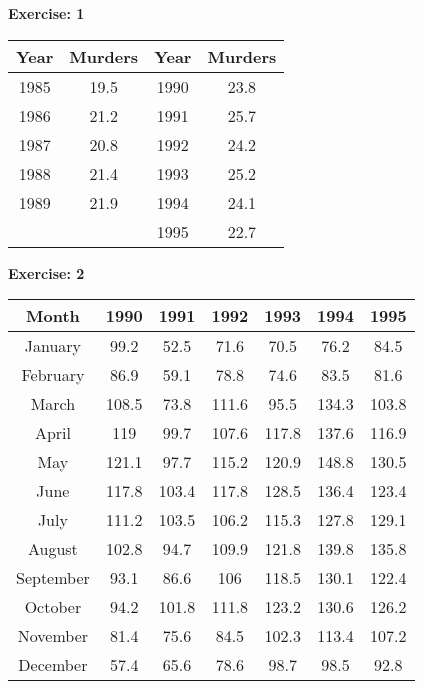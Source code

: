 \documentclass[12pt, english]{article}
\numberwithin{equation}{section} %
\theoremstyle{plain}
\theoremstyle{definition}
\begin{document}
\newpage
\begin{center}
	\huge{\textbf{Exercise: 1}}
\end{center}

\begin{center}
	\begin{tabular}{||c|c|c|c||}
		\hline\hline
		Year & Murders & Year & Murders \\
		\hline\hline
		1985 & 19.5 & 1990 & 23.8 \\
		1986 & 21.2 & 1991 & 25.7 \\
		1987 & 20.8 & 1992 & 24.2 \\
		1988 & 21.4 & 1993 & 25.2 \\
		1989 & 21.9 & 1994 & 24.1 \\
		& & 1995 & 22.7 \\
		\hline\hline
	\end{tabular}
\end{center}

\newpage
\begin{center}
	\huge{\textbf{Exercise: 2}}
\end{center}

\begin{center}
	\begin{tabular}{||c|c|c|c|c|c|c||}
		\hline\hline
		Month     & 1990  & 1991  & 1992  & 1993  & 1994  & 1995  \\
		\hline\hline
		January   & 99.2  & 52.5  & 71.6  & 70.5  & 76.2  & 84.5  \\
		February  & 86.9  & 59.1  & 78.8  & 74.6  & 83.5  & 81.6  \\
		March     & 108.5 & 73.8  & 111.6 & 95.5  & 134.3 & 103.8 \\
		April     & 119   & 99.7  & 107.6 & 117.8 & 137.6 & 116.9 \\
		May       & 121.1 & 97.7  & 115.2 & 120.9 & 148.8 & 130.5 \\
		June      & 117.8 & 103.4 & 117.8 & 128.5 & 136.4 & 123.4 \\
		July      & 111.2 & 103.5 & 106.2 & 115.3 & 127.8 & 129.1 \\
		August    & 102.8 & 94.7  & 109.9 & 121.8 & 139.8 & 135.8 \\
		September & 93.1  & 86.6  & 106   & 118.5 & 130.1 & 122.4 \\
		October   & 94.2  & 101.8 & 111.8 & 123.2 & 130.6 & 126.2 \\
		November  & 81.4  & 75.6  & 84.5  & 102.3 & 113.4 & 107.2 \\
		December  & 57.4  & 65.6  & 78.6  & 98.7  & 98.5  & 92.8  \\
		\hline\hline
	\end{tabular}
\end{center}
\end{document}
